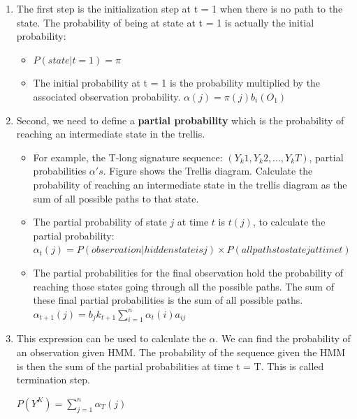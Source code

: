 \begin{enumerate}
\item The first step is the initialization step at t = 1 when there is no path to the state. The probability of being at state at t = 1 is actually the initial probability:
\begin{itemize}
 \item $P (state | t = 1) = \pi $
\item The initial probability at t = 1 is the probability multiplied by the associated observation probability.
$\alpha(j) = \pi(j) b_i (O_1)$
\end{itemize}
\item Second, we need to define a \textbf{partial probability} which is the probability of reaching an intermediate state in the trellis.
\begin{itemize}
\item For example, the T-long signature sequence: $(Y_k1, Y_k2,..., Y_kT)$, partial probabilities $\alpha 's$. Figure shows the Trellis diagram. Calculate the probability of reaching an intermediate state in the trellis diagram as the sum of all possible paths to that state.
\item The partial probability of state $j$ at time $t$ is $t(j)$, to calculate the partial probability:
$\alpha_t(j) = P (observation | hidden state is j) \times P (all paths to state j at time t)$
\item The partial probabilities for the final observation hold the probability of reaching those states going through all the possible paths. The sum of these final partial probabilities is the sum of all possible paths. 
\hspace {4.5 cm}$\alpha_{t+1}(j) = b_jk_{t+1} \sum\limits^{n}_{i = 1} \alpha_t(i) a_{ij}$

\end{itemize}
\item This expression can be used to calculate the $\alpha$. We can find the probability of an observation given HMM. The probability of the sequence given the HMM is then the sum of the partial probabilities at time t = T. This is called termination step.
 
 \hspace {4.5 cm}$P(Y^K) = \sum\limits^{n}_{j=1} \alpha_T (j)$
\end{enumerate}

